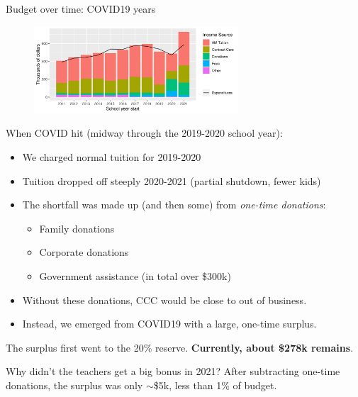 \documentclass[8pt]{beamer}
\begin{document}
\begin{frame}{Budget over time: COVID19 years}
\begin{figure}
\begin{center}
\includegraphics[width=3in]{budget_history_w_income_source.png}
\end{center}
\end{figure}

When COVID hit (midway through the 2019-2020 school year):
%
\begin{itemize}
%
\item We charged normal tuition for 2019-2020
\item Tuition dropped off steeply 2020-2021 (partial shutdown, fewer kids)
\item The shortfall was made up (and then some) from {\em one-time donations}:
\begin{itemize}
    \item Family donations
    \item Corporate donations
    \item Government assistance (in total over \$300k)
\end{itemize}
\item Without these donations, CCC would be close to out of business.
\item Instead, we emerged from COVID19 with a large, one-time surplus.
%
\end{itemize}
%
The surplus first went to the 20\% reserve.
\textbf{Currently, about \$278k remains}.

Why didn't the teachers get a big bonus in 2021?  After subtracting one-time
donations, the surplus was only $\sim$\$5k, less than 1\% of budget.

\end{frame}


\end{document}
